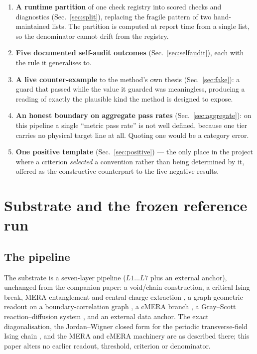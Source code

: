 \documentclass[11pt,a4paper]{article}
\begin{document}
\begin{enumerate}[leftmargin=1.4em,itemsep=2pt]
  \item \textbf{A runtime partition} of one check registry into scored checks
        and diagnostics (Sec.~\ref{sec:split}), replacing the fragile pattern
        of two hand-maintained lists. The partition is computed at report time
        from a single list, so the denominator cannot drift from the registry.
  \item \textbf{Five documented self-audit outcomes} (Sec.~\ref{sec:selfaudit}),
        each with the rule it generalises to.
  \item \textbf{A live counter-example} to the method's own thesis
        (Sec.~\ref{sec:fake}): a guard that passed while the value it guarded
        was meaningless, producing a reading of exactly the plausible kind the
        method is designed to expose.
  \item \textbf{An honest boundary on aggregate pass rates}
        (Sec.~\ref{sec:aggregate}): on this pipeline a single ``metric pass
        rate'' is not well defined, because one tier carries no physical
        target line at all. Quoting one would be a category error.
  \item \textbf{One positive template} (Sec.~\ref{sec:positive}) --- the only
        place in the project where a criterion \emph{selected} a convention
        rather than being determined by it, offered as the constructive
        counterpart to the five negative results.
\end{enumerate}

\section{Substrate and the frozen reference run}
\label{sec:substrate}

\subsection{The pipeline}

The substrate is a seven-layer pipeline ($L1 \dots L7$ plus an external anchor),
unchanged from the companion paper: a void/chain construction, a critical Ising
break, MERA entanglement and central-charge extraction \cite{vidal,calabrese}, a
graph-geometric readout on a boundary-correlation graph \cite{ollivier,forman},
a cMERA branch \cite{haegeman}, a Gray--Scott reaction--diffusion system
\cite{pearson}, and an external data anchor. The exact diagonalisation, the
Jordan--Wigner closed form for the periodic transverse-field Ising chain
\cite{pfeuty}, and the MERA and cMERA machinery are as described there; this
paper alters no earlier readout, threshold, criterion or denominator.
\end{document}
